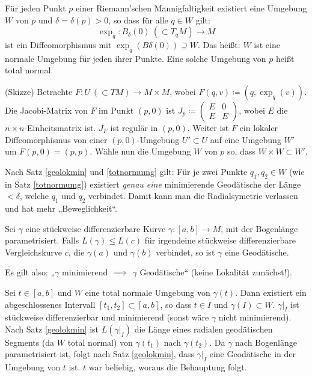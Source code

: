 \documentclass[a4paper,twoside,DIV15,BCOR12mm]{scrbook}
\renewcommand{\da}{\coloneqq}
\begin{document}
\begin{satz}
\label{totnormumg}
Für jeden Punkt $p$ einer Riemann’schen Mannigfaltigkeit existiert eine Umgebung $W$ von $p$ und $\delta = \delta(p)>0$, so dass für alle $q\in W$ gilt:
\[
\exp_q : B_\delta(0)\ (\subset T_qM) \to M
\]
ist ein Diffeomorphismus mit $\exp_q (B\delta(0)) \supseteq W$. Das heißt: $W$ ist eine normale Umgebung für jeden ihrer Punkte. Eine solche Umgebung von $p$ heißt total normal.
\end{satz}

\begin{beweis}
(Skizze) Betrachte $F:U\ (\subset TM)\to M\times M$, wobei $F(q,v) \da (q,\exp_q(v))$. Die Jacobi-Matrix von $F$ im Punkt $(p,0)$ ist $J_p \da \begin{pmatrix} E & 0 \\ E & E \end{pmatrix}$, wobei $E$ die $n\times n$-Einheitsmatrix ist. $J_F$ ist regulär in $(p,0)$. Weiter ist $F$ ein lokaler Diffeomorphismus von einer $(p,0)$-Umgebung $U'\subset U$ auf eine Umgebung $W'$ um $F(p,0) = (p,p)$. Wähle nun die Umgebung $W$ von $p$ so, dass $W\times W\subset W'$.
\end{beweis}

\begin{bemerkung}
Nach Satz \ref{geolokmin} und \ref{totnormumg} gilt: Für je zwei Punkte $q_1,q_2\in W$ (wie in Satz \ref{totnormumg}) existiert \emph{genau eine} minimierende Geodätische der Länge $<\delta$, welche $q_1$ und $q_2$ verbindet. Damit kann man die Radialsymetrie verlassen und hat mehr „Beweglichkeit“.
\end{bemerkung}

\begin{korrolar}
Sei $\gamma$ eine stückweise differenzierbare Kurve $\gamma:[a,b]\to M$, mit der Bogenlänge parametrisiert. Falls $L(\gamma) \le L(c)$ für irgendeine
stückweise differenzierbare Vergleichskurve $c$, die $\gamma(a)$ und $\gamma(b)$ verbindet, so ist $\gamma$ eine Geodätische.

Es gilt also: „$\gamma$ minimierend $\implies$ $\gamma$ Geodätische“ (keine Lokalität zunächst!).
\end{korrolar}

\begin{beweis}
Sei $t\in[a,b]$ und $W$ eine total normale Umgebung von $\gamma(t)$. Dann existiert ein abgeschlossenes Intervall $[t_1,t_2] \subset [a,b]$, so dass $t\in I$ und $\gamma(I)\subset W$. $\gamma|_I$ ist stückweise differenzierbar und minimierend (sonst wäre $\gamma$ nicht minimierend). Nach Satz \ref{geolokmin} ist $L(\gamma|_I)$ die Länge eines radialen geodätischen Segments (da $W$ total normal) von $\gamma(t_1)$ nach $\gamma(t_2)$. Da $\gamma$ nach Bogenlänge parametrisiert ist, folgt nach Satz \ref{geolokmin}, dass $\gamma|_I$ eine Geodätische in der Umgebung von $t$ ist. $t$ war beliebig, woraus die Behauptung folgt.
\end{beweis}
\end{document}
